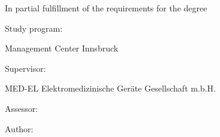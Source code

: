 \thispagestyle{empty}
\begin{center}
\sffamily
\textbf{\huge\docTitle}

\vspace*{1cm}


\vspace*{1.5cm}
\Large In partial fulfillment of the requirements for the degree

\glqq \Large \degree \grqq

\vspace*{1cm}

\Large Study program:

\textbf{\Large\studyProgram}

\Large Management Center Innsbruck

\vspace*{1.5cm}

\Large Supervisor:

MED-EL Elektromedizinische Geräte Gesellschaft m.b.H.

\textbf{\Large\supervisorName}


\Large Assessor:

\textbf{\Large\assesorName}

\vspace*{1cm}

\Large Author:

\textbf{\Large\authorName}

\textbf{\Large\matnr}
\end{center}

\newpage
